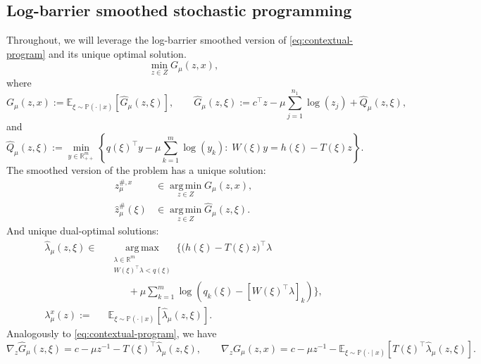 \documentclass{article}
\newcommand{\R}{\mathbb{R}}
\newcommand{\E}{\mathbb{E}}
\newcommand{\argmin}{\operatorname*{arg\,min}}
\newcommand{\argmax}{\operatorname*{arg\,max}}
\theoremstyle{plain}
\theoremstyle{definition}
\theoremstyle{remark}
\begin{document}
\subsection{Log-barrier smoothed stochastic programming}
\label{sec:contextual-logbarrier}
Throughout, we will leverage the log-barrier smoothed version of \eqref{eq:contextual-program} and its unique
optimal solution.
\begin{equation}
\label{eq:contextual-program-mu}
\min_{z\in Z} G_\mu(z,x),
\end{equation}
where
\begin{equation}
\label{eq:contextual-G-mu}
G_\mu(z,x):=\E_{\xi\sim\mathbb P(\cdot\mid x)}\!\left[\hat G_\mu(z,\xi)\right],
\qquad
\hat G_\mu(z,\xi):=c^\top z-\mu\sum_{j=1}^{n_1}\log(z_j)+\hat Q_\mu(z,\xi),
\end{equation}
and
\begin{equation}
\label{eq:contextual-hatQ-mu}
\hat Q_\mu(z,\xi):=
\min_{y\in\R^{m}_{++}}
\left\{
q(\xi)^\top y-\mu\sum_{k=1}^{m}\log(y_k):\;W(\xi)y=h(\xi)-T(\xi)z
\right\}.
\end{equation}
The smoothed version of the problem has a unique solution:
\begin{equation}
\label{eq:canonical-contextual-solution-mu}
\begin{aligned}
z_\mu^{\#,x} &\in \argmin_{z\in Z} G_\mu(z,x),\\
\hat z_\mu^{\#}(\xi) &\in \argmin_{z\in Z} \hat G_\mu(z,\xi).
\end{aligned}
\end{equation}
And unique dual-optimal solutions:
\begin{equation}
\label{eq:contextual-dual-mu}
\begin{aligned}
\hat\lambda_\mu(z,\xi)\in\;&
\argmax_{\substack{\lambda\in\R^{m}\\ W(\xi)^\top\lambda<q(\xi)}}
\Bigg\{
\big(h(\xi)-T(\xi)z\big)^\top\lambda \\
&\qquad
+ \mu\sum_{k=1}^{m}\log\!\left(q_k(\xi)-[W(\xi)^\top\lambda]_k\right)
\Bigg\},\\
\lambda_\mu^x(z):=\;&\E_{\xi\sim\mathbb P(\cdot\mid x)}\!\left[\hat\lambda_\mu(z,\xi)\right].
\end{aligned}
\end{equation}
Analogously to \eqref{eq:contextual-program}, we have
\begin{equation}
\label{eq:danskin-contextual-mu}
\nabla_z \hat G_\mu(z,\xi)=c-\mu z^{-1}-T(\xi)^\top\hat\lambda_\mu(z,\xi),
\qquad
\nabla_z G_\mu(z,x)=c-\mu z^{-1}-\E_{\xi\sim\mathbb P(\cdot\mid x)}\!\left[T(\xi)^\top\hat\lambda_\mu(z,\xi)\right].
\end{equation}
\end{document}
